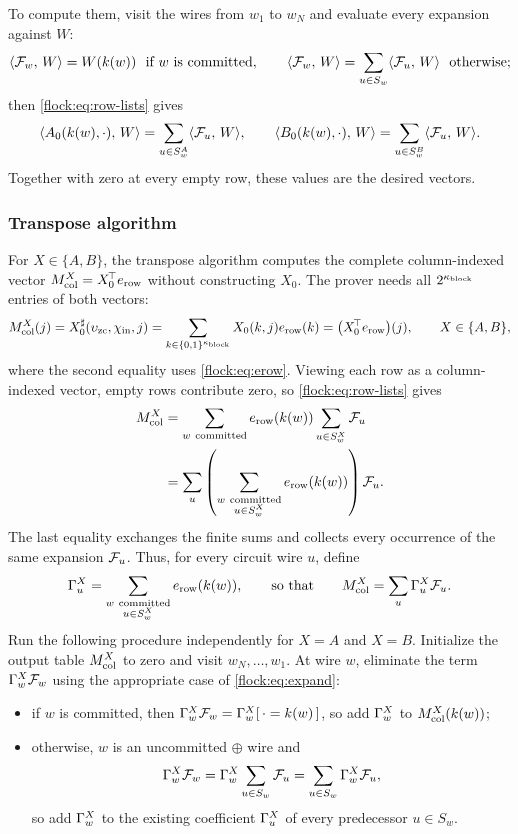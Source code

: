 To compute them, visit the wires from $w_1$ to $w_N$ and evaluate every expansion against $W$:
\[
\langle \mathcal{F}_{w},\, W \rangle=W(k(w))\ \text{ if $w$ is committed},\qquad \langle \mathcal{F}_{w},\, W \rangle=\sum_{u\in S_w}\langle \mathcal{F}_{u},\, W \rangle\ \text{ otherwise};
\]
then \eqref{flock:eq:row-lists} gives
\begin{equation}\label{flock:eq:row-pair}
\langle A_0(k(w),\cdot),\, W \rangle=\sum_{u\in S^A_w}\langle \mathcal{F}_{u},\, W \rangle,\qquad \langle B_0(k(w),\cdot),\, W \rangle=\sum_{u\in S^B_w}\langle \mathcal{F}_{u},\, W \rangle.
\end{equation}
Together with zero at every empty row, these values are the desired vectors.

\subsubsection{Transpose algorithm}\label{flock:backward}

For $X\in\{A,B\}$, the transpose algorithm computes the complete column-indexed vector $M_{\mathrm{col}}^{X}=X_0^{\!\top}e_{\mathrm{row}}$ without constructing $X_0$. The prover needs all $2^{\kappa_{\mathrm{block}}}$ entries of both vectors:
\begin{equation}\label{flock:eq:marginal}
M_{\mathrm{col}}^{X}(j)=X^{\sharp}_0(\upsilon_{\mathrm{zc}},\chi_{\mathrm{in}},j)=\sum_{k\in\{0,1\}^{\kappa_{\mathrm{block}}}}X_0(k,j)e_{\mathrm{row}}(k)=\bigl(X_0^{\!\top}e_{\mathrm{row}}\bigr)(j),\qquad X\in\{A,B\},
\end{equation}
where the second equality uses \eqref{flock:eq:erow}. Viewing each row as a column-indexed vector, empty rows contribute zero, so \eqref{flock:eq:row-lists} gives
\begin{align*}
M_{\mathrm{col}}^{X}
&=\sum_{w\ \mathrm{committed}}e_{\mathrm{row}}(k(w))\sum_{u\in S^X_w}\mathcal{F}_{u}\\
&=\sum_u\left(\sum_{\substack{w\ \mathrm{committed}\\u\in S^X_w}}e_{\mathrm{row}}(k(w))\right)\mathcal{F}_{u}.
\end{align*}
The last equality exchanges the finite sums and collects every occurrence of the same expansion $\mathcal{F}_{u}$. Thus, for every circuit wire $u$, define
\begin{equation*}
\chg{u}^{X}=\sum_{\substack{w\ \mathrm{committed}\\u\in S^X_w}}\erow(\posof{w}),
\qquad \text{so that}\qquad
\colmar^{X}=\sum_u\chg{u}^{X}\lform{u}.
\end{equation*}
Run the following procedure independently for $X=A$ and $X=B$. Initialize the output table $M_{\mathrm{col}}^{X}$ to zero and visit $w_N,\ldots,w_1$. At wire $w$, eliminate the term $\Gamma_{w}^{X}\mathcal{F}_{w}$ using the appropriate case of \eqref{flock:eq:expand}:
\begin{itemize}
\item if $w$ is committed, then $\Gamma_{w}^{X}\mathcal{F}_{w}=\Gamma_{w}^{X}[\,\cdot=k(w)\,]$, so add $\Gamma_{w}^{X}$ to $M_{\mathrm{col}}^{X}(k(w))$;
\item otherwise, $w$ is an uncommitted $\oplus$ wire and
\[
\Gamma_{w}^{X}\mathcal{F}_{w}=\Gamma_{w}^{X}\sum_{u\in S_w}\mathcal{F}_{u}=\sum_{u\in S_w}\Gamma_{w}^{X}\mathcal{F}_{u},
\]
so add $\Gamma_{w}^{X}$ to the existing coefficient $\Gamma_{u}^{X}$ of every predecessor $u\in S_w$.
\end{itemize}


